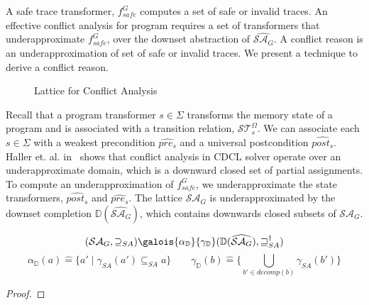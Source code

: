 A safe trace transformer, $f_{safe}^{G}$ computes a set of safe or
invalid traces.  An effective conflict analysis for program requires a set of 
transformers that underapproximate $f_{safe}^{G}$, over the 
downset abstraction of $\widehat{\mathcal{SA}_{G}}$.  A conflict reason 
is an underapproximation of set of safe or invalid traces. We present a
technique to derive a conflict reason.  
%
\begin{figure}[htbp]
\centering
\vspace*{-0.2cm}
\caption{Lattice for Conflict Analysis \label{downset}}
\end{figure}
%
Recall that a program transformer $s \in \Sigma$ transforms the memory state of a
program and is associated with a transition relation,
$\mathcal{ST}_{s}^{\Omega}$.  We can associate each $s \in \Sigma$ with a weakest
precondition $\widehat{pre_{s}}$ and a universal postcondition
$\widehat{post_{s}}$. 
%
Haller et. al. in~\cite{sas12} shows that conflict analysis in CDCL solver operate 
over an underapproximate domain, which is a downward closed set of partial 
assignments. 
%
To compute an underapproximation of $f_{safe}^{G}$, we underapproximate the
state transformers, $\widehat{post_s}$ and $\widehat{pre_s}$.  The lattice  
$\mathcal{SA}_{G}$ is underapproximated by the downset completion 
$\mathbb{D}(\widehat{\mathcal{SA}_{G}})$, which contains downwards closed
subsets of $\mathcal{SA}_{G}$.
%
\begin{proposition}
\[
  (\mathcal{SA}_{G},\supseteq_{SA})
   \galois{\alpha_{\mathbb{D}}}{\gamma_{\mathbb{D}}}
   (\mathbb{D}(\widehat{\mathcal{SA}_{G}}),\sqsupseteq_{SA}^\dagger) 
\]
  \[
    \alpha_{\mathbb{D}}(a) \mathrel{\hat=} \{a' \mid \gamma_{SA}(a')
    \subseteq_{SA} a \}
  \qquad
  \gamma_{\mathbb{D}}(b) \mathrel{\hat=} \{\bigcup_{b' \in decomp(b)}
  \gamma_{SA}(b')\}
  \]
\end{proposition}
%
\begin{proof} 
\end{proof}
